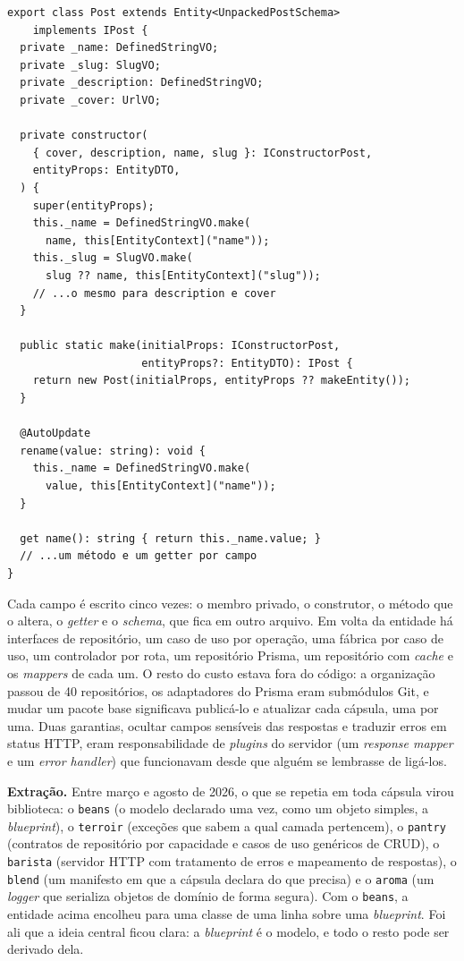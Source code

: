 \documentclass[a4paper,12pt]{article}
\newcommand{\estr}[1]{\textit{#1}}
\begin{document}
\begin{lstlisting}[float=htbp,caption={Entidade \texttt{Post} da cápsula de \estr{posts} do Roastery (trecho).},label={lst:roastery}]
export class Post extends Entity<UnpackedPostSchema>
    implements IPost {
  private _name: DefinedStringVO;
  private _slug: SlugVO;
  private _description: DefinedStringVO;
  private _cover: UrlVO;

  private constructor(
    { cover, description, name, slug }: IConstructorPost,
    entityProps: EntityDTO,
  ) {
    super(entityProps);
    this._name = DefinedStringVO.make(
      name, this[EntityContext]("name"));
    this._slug = SlugVO.make(
      slug ?? name, this[EntityContext]("slug"));
    // ...o mesmo para description e cover
  }

  public static make(initialProps: IConstructorPost,
                     entityProps?: EntityDTO): IPost {
    return new Post(initialProps, entityProps ?? makeEntity());
  }

  @AutoUpdate
  rename(value: string): void {
    this._name = DefinedStringVO.make(
      value, this[EntityContext]("name"));
  }

  get name(): string { return this._name.value; }
  // ...um método e um getter por campo
}
\end{lstlisting}

Cada campo é escrito cinco vezes: o membro privado, o construtor, o método que o altera, o \estr{getter} e o \estr{schema}, que fica em outro arquivo. Em volta da entidade há interfaces de repositório, um caso de uso por operação, uma fábrica por caso de uso, um controlador por rota, um repositório Prisma, um repositório com \estr{cache} e os \estr{mappers} de cada um. O resto do custo estava fora do código: a organização passou de 40 repositórios, os adaptadores do Prisma eram submódulos Git, e mudar um pacote base significava publicá-lo e atualizar cada cápsula, uma por uma. Duas garantias, ocultar campos sensíveis das respostas e traduzir erros em status HTTP, eram responsabilidade de \estr{plugins} do servidor (um \estr{response mapper} e um \estr{error handler}) que funcionavam desde que alguém se lembrasse de ligá-los.

\textbf{Extração.} Entre março e agosto de 2026, o que se repetia em toda cápsula virou biblioteca: o \texttt{beans} (o modelo declarado uma vez, como um objeto simples, a \estr{blueprint}), o \texttt{terroir} (exceções que sabem a qual camada pertencem), o \texttt{pantry} (contratos de repositório por capacidade e casos de uso genéricos de CRUD), o \texttt{barista} (servidor HTTP com tratamento de erros e mapeamento de respostas), o \texttt{blend} (um manifesto em que a cápsula declara do que precisa) e o \texttt{aroma} (um \estr{logger} que serializa objetos de domínio de forma segura). Com o \texttt{beans}, a entidade acima encolheu para uma classe de uma linha sobre uma \estr{blueprint}. Foi ali que a ideia central ficou clara: a \estr{blueprint} é o modelo, e todo o resto pode ser derivado dela.
\end{document}
